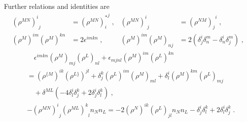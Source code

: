 %
%
Further relations and identities are 
%
%
\begin{align}
{\left(\rho^{MN}\right)^{i}}_{j} &= {\left(\rho^{MN}\right)^{*}_{i}}^{j}\;, & {\left(\rho^{MN}\right)^{i}}_{j} &= {\left(\rho^{NM}\right)_{j}}^{i}\;,
\label{eq: SO6_id} \\
 (\rho^M)^{im} (\rho^M)^{kn}&=2\epsilon^{imkn}\;, &  (\rho^M)^{im} (\rho^M)_{nj}&=2\left(\delta^i_j \delta^m_n -\delta^i_n \delta^m_j\right)\;,
\end{align}
%
%
\begin{align}
 &\quad \epsilon^{imkn} (\rho^M)_{mj}(\rho^L)_{nl}+\epsilon_{mjnl}(\rho^M)^{im}(\rho^L)^{kn}\\
 &=(\rho^{\{M})^{ik}(\rho^{L\}})^{jl}+\delta^k_j(\rho^L)^{im}(\rho^M)_{ml}+\delta^i_l(\rho^M)^{km}(\rho^L)_{mj}\nonumber \\
 &\quad+\delta^{ML}\left(-4\delta^i_l \delta^k_j +2\delta^i_j\delta^k_l\right)\;,\nonumber\\[0.4cm]
& -{(\rho^{MN})^i}_j {(\rho^{ML})^k}_l n_N n_L=-2(\rho^{N})^{ik} (\rho^{L})_{jl} n_N n_L-\delta^i_j \delta^k_l+2\delta^i_l \delta^k_j \;.
\end{align}
%
%
%
%
%
%
%
